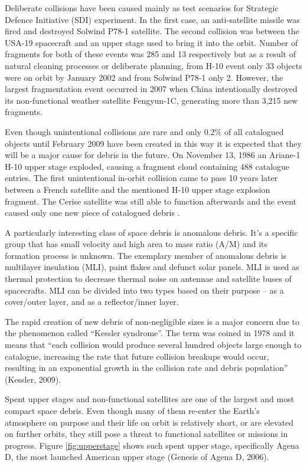 	Deliberate collisions have been caused mainly as test scenarios for Strategic Defence Initiative (SDI) experiment. In the first case, an anti-satellite missile was fired and destroyed Solwind P78-1 satellite. The second collision was between the USA-19 spacecraft and an upper stage used to bring it into the orbit. Number of fragments for both of these events was 285 and 13 respectively but as a result of natural cleaning processes or deliberate planning, from H-10 event only 33 objects were on orbit by January 2002 and from Solwind P78-1 only 2. However, the largest fragmentation event occurred in 2007 when China intentionally destroyed its non-functional weather satellite Fengyun-1C, generating more than 3,215 new fragments. 
	
	Even though unintentional collisions are rare and only 0.2\% of all catalogued objects until February 2009 have been created in this way it is expected that they will be a major cause for debris in the future. On November 13, 1986 an Ariane-1 H-10 upper stage exploded, causing a fragment cloud containing 488 catalogue entries. The first unintentional in-orbit collision came to pass 10 years later between a French satellite and the mentioned H-10 upper stage explosion fragment. The Cerise satellite was still able to function afterwards and the event caused only one new piece of catalogued debris \citep{Silha2012id}. 
	
	A particularly interesting class of space debris is anomalous debris. It's a specific group that has small velocity and high area to mass ratio (A/M) and its formation process is unknown. The exemplary member of anomalous debris is multilayer insulation (MLI),  paint flakes and defunct solar panels. MLI is used as thermal protection to decrease thermal noise on antennae and satellite buses of spacecrafts. MLI can be divided into two types based on their purpose – as a cover/outer layer, and as a reflector/inner layer.
	
	The rapid creation of new debris of non-negligible sizes is a major concern due to the phenomenon called “Kessler syndrome”. The term was coined in 1978 and it means that “each collision would produce several hundred objects large enough to catalogue, increasing the rate that future collision breakups would occur, resulting in an exponential growth in the collision rate and debris population” (Kessler, 2009).
	
	Spent upper stages and non-functional satellites are one of the largest and most compact space debris. Even though many of them re-enter the Earth's atmosphere on purpose and their life on orbit is relatively short, or are elevated on further orbits, they still pose a threat to functional satellites or missions in progress. Figure \ref{fig:upperstage} shows such spent upper stage, specifically Agena D, the most launched American upper stage (Genesis of Agena D, 2006).
	

